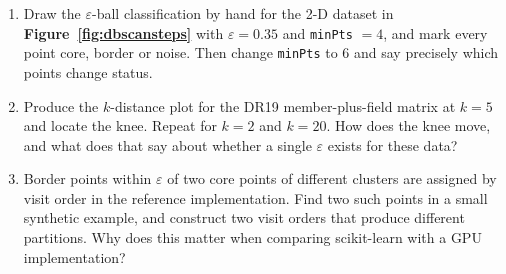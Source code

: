 \begin{issues}[EXERCISES]
\begin{enumerate}
\item Draw the $\varepsilon$-ball classification by hand for the 2-D dataset
  in \textbf{Figure~\ref{fig:dbscansteps}} with $\varepsilon = 0.35$ and
  \texttt{minPts} $=4$, and mark every point core, border or noise. Then
  change \texttt{minPts} to 6 and say precisely which points change status.
\item Produce the $k$-distance plot for the DR19 member-plus-field matrix at
  $k=5$ and locate the knee. Repeat for $k=2$ and $k=20$. How does the knee
  move, and what does that say about whether a single $\varepsilon$ exists for
  these data?
\item Border points within $\varepsilon$ of two core points of different
  clusters are assigned by visit order in the reference implementation. Find
  two such points in a small synthetic example, and construct two visit orders
  that produce different partitions. Why does this matter when comparing
  scikit-learn with a GPU implementation?
\end{enumerate}
\end{issues}
